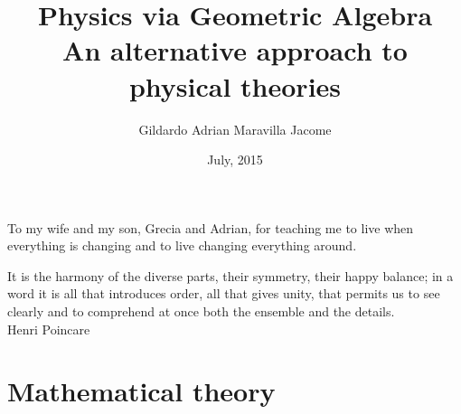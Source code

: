 \documentclass[11pt]{book}
\title{ \textbf{Physics via Geometric Algebra} \\ An alternative approach to physical theories}
\author{Gildardo Adrian Maravilla Jacome}
\date{July, 2015}
\newenvironment{dedication}
{
   \cleardoublepage
   \thispagestyle{empty}
   \vspace*{\stretch{.5}}
   \hfill\begin{minipage}[t]{0.40\textwidth}
   \raggedright
}
{
   \end{minipage}
   \vspace*{\stretch{3}}
   \clearpage
}
\begin{document}
\frontmatter
\maketitle
\begin{dedication}
To my wife and my son, Grecia and Adrian, for teaching me to live when everything is changing and to live changing everything around.

\hfill \newline

It is the harmony of the diverse parts, their symmetry, their happy balance; in a word it is all that introduces order, all that gives unity, that permits us to see clearly and to comprehend at once both the ensemble and the details. \\

Henri Poincare

\end{dedication}
 
\tableofcontents
\mainmatter
\part{Mathematical theory}
 





\backmatter 
\end{document}
